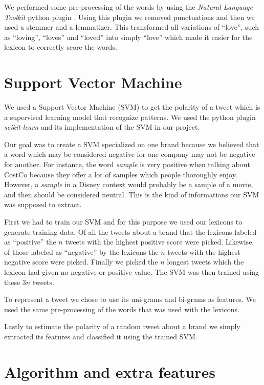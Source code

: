 \documentclass[a4paper,12pt]{report}
\begin{document}
We performed some pre-processing of the words by using the \textit{Natural Language Toolkit} python plugin \cite{NLTK}.
Using this plugin we removed punctuations and then we used a stemmer and a lemmatizer. This transformed all variations of ``love'', such as ``loving'', ``loves'' and ``loved'' into simply ``love'' which made it easier for the lexicon to correctly score the words.

\section{Support Vector Machine}

We used a Support Vector Machine (SVM) to get the polarity of a tweet which is a supervised learning model that recognize patterns. We used the python plugin \textit{scikit-learn}\cite{Scikit} and its implementation of the SVM in our project.

Our goal was to create a SVM specialized on one brand because we believed that a word which may be considered negative for one company may not be negative for another.
For instance, the word \textit{sample} is very positive when talking about CostCo because they offer a lot of samples which people thoroughly enjoy. However, a \textit{sample} in a Disney context would probably be a sample of a movie, and then should be considered neutral.
This is the kind of informations our SVM was supposed to extract.

First we had to train our SVM and for this purpose we used our lexicons to generate training data. Of all the tweets about a brand that the lexicons labeled as ``positive'' the $n$ tweets with the highest positive score were picked. Likewise, of those labeled as ``negative'' by the lexicons the $n$ tweets with the highest negative score were picked. Finally we picked the $n$ longest tweets which the lexicon had given no negative or positive value. The SVM was then trained using these $3n$ tweets.

To represent a tweet we chose to use its uni-grams and bi-grams as features. We used the same pre-processing of the words that was used with the lexicons.

Lastly to estimate the polarity of a random tweet about a brand we simply extracted its features and classified it using the trained SVM.

\section{Algorithm and extra features}
\end{document}
